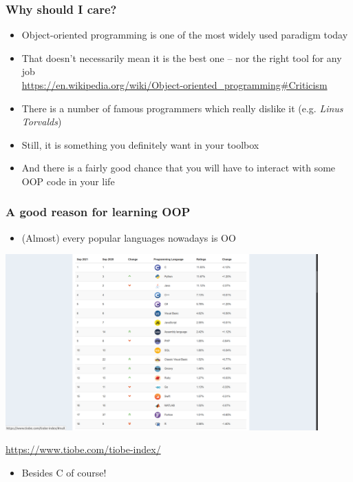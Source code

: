 \documentclass[9pt]{beamer}
\begin{document}
\begin{frame}
  \frametitle{Why should I care?}

  \begin{itemize}
    \item Object-oriented programming is one of the most widely used paradigm today
    \smallskip
    \item That doesn't necessarily mean it is the best one -- nor the right tool for any job \\
    \tiny
    \url{https://en.wikipedia.org/wiki/Object-oriented_programming\#Criticism}
    \normalsize
    \smallskip

    \item There is a number of famous programmers which really dislike it (e.g. \emph{Linus Torvalds})
    \medskip
    \item Still, it is something you definitely want in your toolbox
    \medskip
    \item And there is a fairly good chance that you will have to interact with some OOP
          code in your life
    \smallskip
  \end{itemize}

\end{frame}


\begin{frame}
  \frametitle{A good reason for learning OOP}

  \begin{itemize}
    \item (Almost) every popular languages nowadays is OO
  \end{itemize}

  \smallskip

  \centering\includegraphics[width=0.9\textwidth]{tiobe2021.png}

  \smallskip

  \tiny \url{https://www.tiobe.com/tiobe-index/} \normalsize

  \smallskip

  \begin{itemize}
    \item Besides C of course!
  \end{itemize}

\end{frame}
\end{document}
